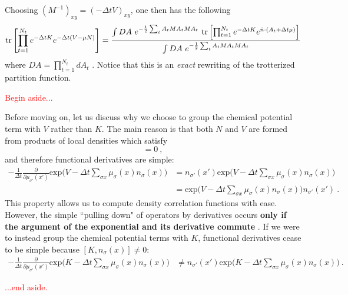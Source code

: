 Choosing $(M^{-1})_{xy} = (-\Delta t V)_{xy}$, one then has the following
\begin{equation}
\text{tr}\left[\prod_{t=1}^{N_t} e^{-\Delta t K}  e^{-\Delta t (V - \mu N)}  \right] = 
\frac{  
\int DA ~ e^{-\frac{1}{2} \sum_t {A}_t M {A}_t M A_t} ~ \text{tr}\left[\prod_{t=1}^{N_t} e^{-\Delta t K}  e^{ \tilde{n}\cdot (A_t + \Delta t \mu )} \right] 
}{ 
\int DA ~ e^{-\frac{1}{2} \sum_t {A}_t M {A}_t M A_t}  
}
\end{equation}
where $DA = \prod_{t=1}^{N_t} d A_t $ . Notice that this is an \emph{exact} rewriting of the trotterized partition function. \\

\begin{center} 
\textcolor{red}{Begin aside...} \\
\end{center}
Before moving on, let us discuss why we choose to group the chemical potential term with $V$ rather than $K$. The main reason is that both $N$ and $V$ are formed from products of local densities which satisfy
\begin{equation*}
[\tilde{n}_{\sigma}(x),\tilde{n}_{\sigma'}(x')] = 0~,
\end{equation*}
and therefore functional derivatives are simple:
\begin{align*}
-\frac{1}{\Delta t} \frac{\partial}{\partial \mu_{\sigma '}(x')}\text{exp}\Big( V - \Delta t \sum_{\sigma x}\mu_{\sigma}(x) n_{\sigma}(x)\Big) & =  n_{\sigma ' }(x') \text{exp}\Big( V - \Delta t \sum_{\sigma x}\mu_{\sigma}(x) n_{\sigma}(x)\Big) \\
& =  \text{exp}\Big( V - \Delta t \sum_{\sigma x}\mu_{\sigma}(x) n_{\sigma}(x)\Big) n_{\sigma ' }(x')~.
\end{align*} 
This property allows us to compute density correlation functions with ease. However, the simple ``pulling down" of operators by derivatives occurs \textbf{only if the argument of the exponential and its derivative commute} \cite{10.2307/4146900}. If we were to instead group the chemical potential terms with $K$, functional derivatives cease to be simple because $[K,n_{\sigma}(x)] \neq 0$: 
\begin{align*}
-\frac{1}{\Delta t} \frac{\partial}{\partial \mu_{\sigma '}(x')}\text{exp}\Big( K - \Delta t \sum_{\sigma x}\mu_{\sigma}(x) n_{\sigma}(x)\Big) & \neq n_{\sigma'}(x') \text{exp}\Big( K - \Delta t \sum_{\sigma x}\mu_{\sigma}(x) n_{\sigma}(x)\Big)~.
\end{align*}
\begin{center}
\textcolor{red}{...end aside.} \\
\end{center} 

